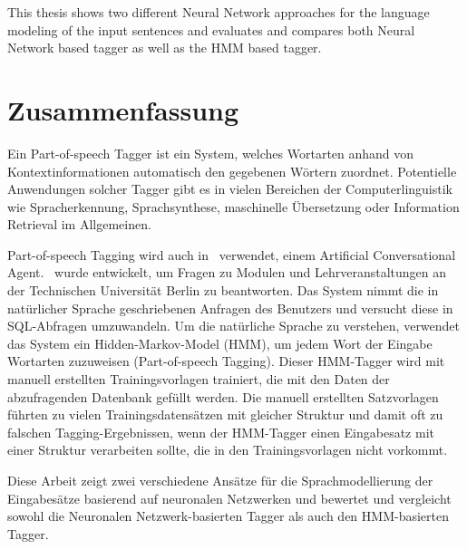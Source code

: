This thesis shows two different Neural Network approaches for the language modeling of the input sentences and evaluates and compares both Neural Network based tagger as well as the HMM based tagger.

\BlankPage

\chapter*{Zusammenfassung}
Ein Part-of-speech Tagger ist ein System, welches Wortarten anhand von Kontextinformationen automatisch den gegebenen Wörtern zuordnet. Potentielle Anwendungen solcher Tagger gibt es in vielen Bereichen der Computerlinguistik wie Spracherkennung, Sprachsynthese, maschinelle Übersetzung oder Information Retrieval im Allgemeinen.

Part-of-speech Tagging wird auch in \Alex\ verwendet, einem Artificial Conversational Agent. \Alex\ wurde entwickelt, um Fragen zu Modulen und Lehrveranstaltungen an der Technischen Universität Berlin zu beantworten. Das System nimmt die in natürlicher Sprache geschriebenen Anfragen des Benutzers und versucht diese in SQL-Abfragen umzuwandeln. Um die natürliche Sprache zu verstehen, verwendet das System ein Hidden-Markov-Model (HMM), um jedem Wort der Eingabe Wortarten zuzuweisen (Part-of-speech Tagging). Dieser HMM-Tagger wird mit manuell erstellten Trainingsvorlagen trainiert, die mit den Daten der abzufragenden Datenbank gefüllt werden. Die manuell erstellten Satzvorlagen führten zu vielen Trainingsdatensätzen mit gleicher Struktur und damit oft zu falschen Tagging-Ergebnissen, wenn der HMM-Tagger einen Eingabesatz mit einer Struktur verarbeiten sollte, die in den Trainingsvorlagen nicht vorkommt.

Diese Arbeit zeigt zwei verschiedene Ansätze für die Sprachmodellierung der Eingabesätze basierend auf neuronalen Netzwerken und bewertet und vergleicht sowohl die Neuronalen Netzwerk-basierten Tagger als auch den HMM-basierten Tagger.

\BlankPage

\tableofcontents

\listoffigures

